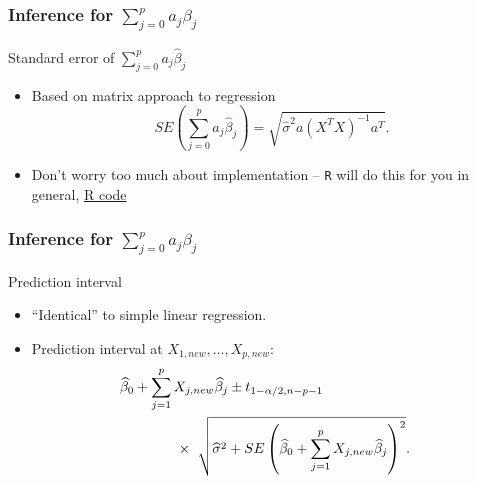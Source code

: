 \documentclass[handout]{beamer}
\newcommand{\RR}{{\tt R} \;}
\begin{document}
   \begin{frame} \frametitle{Inference for $\sum_{j=0}^p a_j \beta_j$}

   \begin{block}
   {Standard error of $\sum_{j=0}^p a_j \widehat{\beta}_j$}
   \begin{itemize}
   \item Based on matrix approach to regression
   $$
   SE\left(\sum_{j=0}^p a_j\widehat{\beta}_j \right) = \sqrt{\widehat{\sigma}^2 a (X^TX)^{-1} a^T}.$$

   \item Don't worry too much about implementation -- \RR will do this for you in general, \href{http://stats191.stanford.edu/multiple.html}{R code}
   \end{itemize}
   \end{block}
   \end{frame}


   \begin{frame} \frametitle{Inference for $\sum_{j=0}^p a_j \beta_j$}

   \begin{block}
   {Prediction interval}
   \begin{itemize}

   \item ``Identical'' to simple linear regression.

   \item Prediction interval at $X_{1,new}, \dots, X_{p,new}$:
   $$
   \begin{aligned}
   \lefteqn{\widehat{\beta}_0 + \sum_{j=1}^p X_{j,new} \widehat{\beta}_j\pm t_{1-\alpha/2, n-p-1}} \\
   & \qquad \qquad  \times \ \sqrt{\widehat{\sigma}^2 + SE\left(\widehat{\beta}_0 + \sum_{j=1}^p X_{j,new}\widehat{\beta}_j\right)^2}.
   \end{aligned}
   $$

   \end{itemize}
   \end{block}
   \end{frame}

\end{document}
